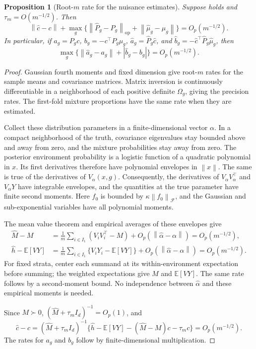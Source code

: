 \documentclass[11pt]{article}
\newtheorem{proposition}{Proposition}[section]
\newcommand{\E}{\mathbb{E}}
\newcommand{\F}{\mathcal{F}}
\newcommand{\op}{\mathrm{op}}
\newcommand{\norm}[1]{\left\lVert #1\right\rVert}
\begin{document}
\newpage

\begin{proposition}[Root-$m$ rate for the nuisance estimates]\label{prop:nuisance_rates}
Suppose  holds and $\tau_m=O(m^{-1/2})$. Then
\[
 \norm{\widehat c-c}+\max_g\{\norm{\widehat P_g-P_g}_{\op}
 +\norm{\widehat\mu_g-\mu_g}\}=O_p(m^{-1/2}).
\]
In particular, if $a_g=P_gc$, $b_g=-c^\top P_g\mu_g$, $\widehat a_g=\widehat P_g\widehat c$, and $\widehat b_g=-\widehat c^\top\widehat P_g\widehat\mu_g$, then
\[
 \max_g\{\norm{\widehat a_g-a_g}+|\widehat b_g-b_g|\}=O_p(m^{-1/2}).
\]
\end{proposition}
\begin{proof}
Gaussian fourth moments and fixed dimension give root-$m$ rates for the sample means and covariance matrices. Matrix inversion is continuously differentiable in a neighborhood of each positive definite $\Omega_g$, giving the precision rates. The first-fold mixture proportions have the same rate when they are estimated.

Collect these distribution parameters in a finite-dimensional vector $\alpha$. In a compact neighborhood of the truth, covariance eigenvalues stay bounded above and away from zero, and the mixture probabilities stay away from zero. The posterior environment probability is a logistic function of a quadratic polynomial in $x$. Its first derivatives therefore have polynomial envelopes in $\norm x$. The same is true of the derivatives of $V_\alpha(x,g)$. Consequently, the derivatives of $V_\alpha V_\alpha^\top$ and $V_\alpha Y$ have integrable envelopes, and the quantities at the true parameter have finite second moments. Here $f_0$ is bounded by $\kappa\norm{f_0}_{\F}$, and the Gaussian and sub-exponential variables have all polynomial moments.

The mean value theorem and empirical averages of these envelopes give
\begin{align*}
 \widehat M-M
 &=\frac1m\sum_{i\in I_1}(V_iV_i^\top-M)+O_p(\norm{\widehat\alpha-\alpha})
 =O_p(m^{-1/2}),\\
 \widehat h-\E[VY]
 &=\frac1m\sum_{i\in I_1}\{V_iY_i-\E[VY]\}
 +O_p(\norm{\widehat\alpha-\alpha})=O_p(m^{-1/2}).
\end{align*}
For fixed strata, center each summand at its within-environment expectation before summing; the weighted expectations give $M$ and $\E[VY]$. The same rate follows by a second-moment bound. No independence between $\widehat\alpha$ and these empirical moments is needed.

Since $M\succ0$, $(\widehat M+\tau_m I_d)^{-1}=O_p(1)$, and
\[
 \widehat c-c=(\widehat M+\tau_m I_d)^{-1}
 \{\widehat h-\E[VY]-(\widehat M-M)c-\tau_m c\}=O_p(m^{-1/2}).
\]
The rates for $a_g$ and $b_g$ follow by finite-dimensional multiplication.
\end{proof}
\end{document}
